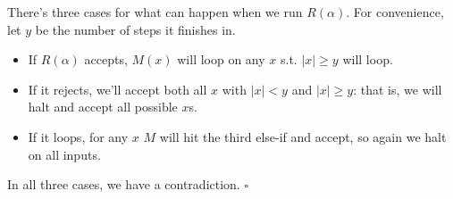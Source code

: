 \documentclass[12pt]{article}
\begin{document}
There's three cases for what can happen when we run $R(\alpha)$.
For convenience, let $y$ be the number of steps it finishes in.
\begin{itemize}[nolistsep]
    \item If $R(\alpha)$ accepts, $M(x)$ will loop on any $x$ s.t. $|x| \ge y$ will loop.
    \item If it rejects, we'll accept both all $x$ with $|x| < y$ and $|x| \ge y$:
          that is, we will halt and accept all possible $x$s.
    \item If it loops, for any $x$ $M$ will hit the third else-if and accept, so again
          we halt on all inputs.
\end{itemize}

In all three cases, we have a contradiction. $\square$
\end{document}

